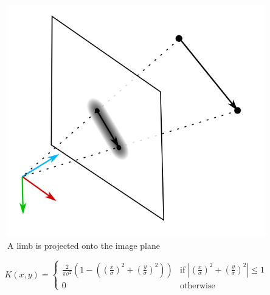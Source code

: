 \begin{figure}
  \centering
  \includegraphics[width=.6\textwidth]{img/projection}
  \caption[Projection]{A limb is projected onto the image plane}
  \label{fig:projection}
\end{figure}

\begin{equation}
  \label{eq:epanechnikov}
  K(x, y) =
  \begin{cases}
    \frac{2}{\pi\sigma^{2}}(1 - ((\frac{x}{\sigma})^{2} + (\frac{y}{\sigma})^{2})) & \text{if } |(\frac{x}{\sigma})^{2} + (\frac{y}{\sigma})^{2}| \leq 1\\
    0 & \text{otherwise}
  \end{cases}
\end{equation}

